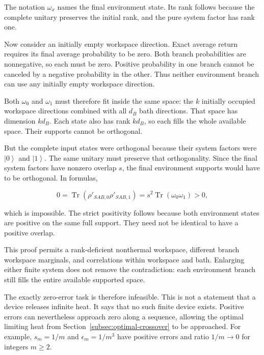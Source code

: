 \documentclass[11pt,letterpaper]{article}
\begin{document}
The notation \(\omega_{x}\) names the final environment state. Its rank follows because the complete unitary preserves the initial rank, and the pure system factor has rank one.

Now consider an initially empty workspace direction. Exact average return requires its final average probability to be zero. Both branch probabilities are nonnegative, so each must be zero. Positive probability in one branch cannot be canceled by a negative probability in the other. Thus neither environment branch can use any initially empty workspace direction.

Both \(\omega_{0}\) and \(\omega_{1}\) must therefore fit inside the same space: the \(k\) initially occupied workspace directions combined with all \(d_{B}\) bath directions. That space has dimension \(kd_{B}\). Each state also has rank \(kd_{B}\), so each fills the whole available space. Their supports cannot be orthogonal.

But the complete input states were orthogonal because their system factors were \(\left| 0 \right\rangle\) and \(\left| 1 \right\rangle\). The same unitary must preserve that orthogonality. Since the final system factors have nonzero overlap \(s\), the final environment supports would have to be orthogonal. In formulas,

\[0 = \operatorname{Tr}\left( \rho\prime_{SAB,0}\rho\prime_{SAB,1} \right) = s^{2}\operatorname{Tr}\left( \omega_{0}\omega_{1} \right) > 0,\]

which is impossible. The strict positivity follows because both environment states are positive on the same full support. They need not be identical to have a positive overlap.

This proof permits a rank-deficient nonthermal workspace, different branch workspace marginals, and correlations within workspace and bath. Enlarging either finite system does not remove the contradiction: each environment branch still fills the entire available supported space.

The exactly zero-error task is therefore infeasible. This is not a statement that a device releases infinite heat. It says that no such finite device exists. Positive errors can nevertheless approach zero along a sequence, allowing the optimal limiting heat from Section~\ref{subsec:optimal-crossover} to be approached. For example, \(s_{m} = 1/m\) and \(\epsilon_{m} = 1/m^{3}\) have positive errors and ratio \(1/m \rightarrow 0\) for integers \(m \geq 2\).
\end{document}
